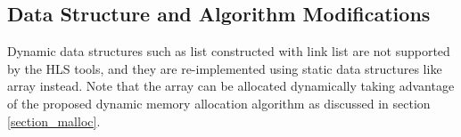 \documentclass[conference]{IEEEtran}
\begin{document}

%
%
%
%
%

\subsection{Data Structure and Algorithm Modifications}
Dynamic data structures such as list constructed with link list are not supported by the HLS tools, and they are re-implemented using static data structures like array instead. Note that the array can be allocated dynamically taking advantage of the proposed dynamic memory allocation algorithm as discussed in section \ref{section_malloc}. 
\end{document}

